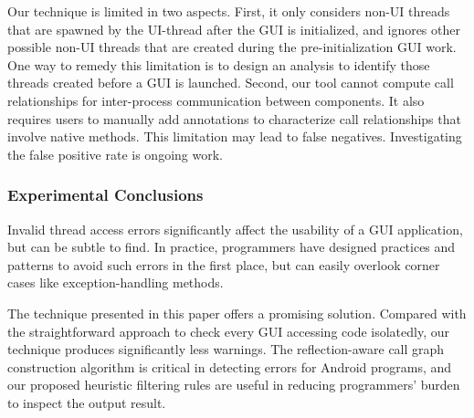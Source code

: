 Our technique is limited in two aspects. First, it only considers
non-UI threads that are spawned by the UI-thread after the GUI
is initialized, and ignores other possible non-UI threads
that are created during the pre-initialization GUI work. One way
to remedy this limitation is to design an analysis to identify
those threads created before a GUI is launched.
Second, our tool cannot compute call relationships
for inter-process communication between components. It also
requires users to manually add annotations to characterize
call relationships that involve native methods. This limitation
may lead to false negatives. Investigating the false positive
rate is ongoing work.




\subsubsection{Experimental Conclusions}

Invalid thread access errors significantly affect the usability of
a GUI application, but can be subtle to find. In practice, programmers
have designed practices and patterns to avoid such errors in the first
place, but can easily overlook corner cases like exception-handling
methods.

The technique presented in this paper offers a promising solution.
Compared with the straightforward approach to check every
GUI accessing code isolatedly, our technique produces significantly
less warnings. The reflection-aware call graph construction algorithm
is critical in detecting errors for Android programs, and our
proposed heuristic filtering rules are useful in reducing programmers'
burden to inspect the output result.


